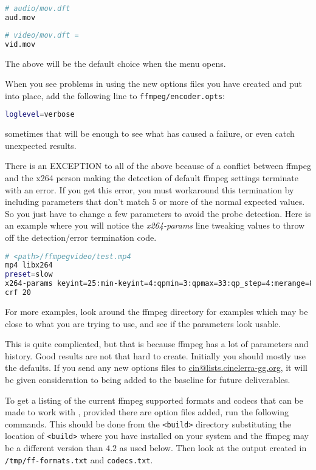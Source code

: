 \begin{lstlisting}[language=bash,numbers=none]
# audio/mov.dft
aud.mov
\end{lstlisting}

\begin{lstlisting}[language=bash,numbers=none]
# video/mov.dft =
vid.mov
\end{lstlisting}

The above will be the default choice when the menu opens.  

When you see problems in using the new options files you have created and put into place, add the following line to \texttt{ffmpeg/encoder.opts}:

\begin{lstlisting}[language=bash,numbers=none]
loglevel=verbose
\end{lstlisting}

sometimes that will be enough to see what has caused a failure, or even catch unexpected results.

There is an \textsc{EXCEPTION} to all of the above because of a conflict between ffmpeg and the x264 person making the detection of default ffmpeg settings terminate with an error.  If you get this error, you must workaround this termination by including parameters that don't match $5$ or more of the normal expected values.  So you just have to change a few parameters to avoid the probe detection.  Here is an example where you will notice the \textit{x264-params} line tweaking values to throw off the detection/error termination code.

\begin{lstlisting}[language=bash,numbers=none]
# <path>/ffmpegvideo/test.mp4
mp4 libx264
preset=slow
x264-params keyint=25:min-keyint=4:qpmin=3:qpmax=33:qp_step=4:merange=8
crf 20
\end{lstlisting}

For more examples, look around the ffmpeg directory for examples which may be close to what you are trying to use, and see if the parameters look usable. 

This is quite complicated, but that is because ffmpeg has a lot of parameters and history.  Good results are not that hard to create.  Initially you should mostly use the defaults.  
If you send any new options files to \href{mailto:cin@lists.cinelerra-gg.org}{cin@lists.cinelerra-gg.org}, it will be given consideration to being added to the baseline for future deliverables.

To get a listing of the current ffmpeg supported formats and codecs that can be made to work with \CGG{}, provided there are option files added, run the following commands.  This should be done from the \texttt{<build>} directory substituting the location of \texttt{<build>} where you have installed \CGG{} on your system and the ffmpeg may be a different version than $4.2$ as used below.  Then look at the output created in \texttt{/tmp/ff-formats.txt} and \texttt{codecs.txt}.

